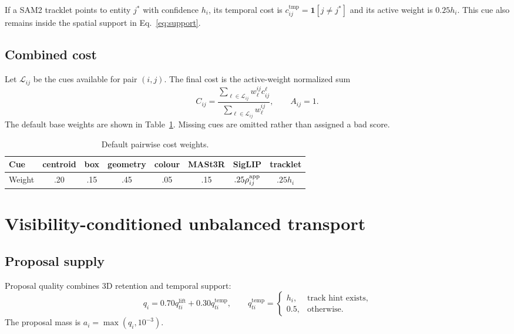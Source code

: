 \documentclass[11pt]{article}
\newcommand{\1}{\bm{1}}
\begin{document}
If a SAM2 tracklet points to entity $j^*$ with confidence $h_i$, its temporal
cost is $c^{\mathrm{tmp}}_{ij}=\1[j\neq j^*]$ and its active weight is
$0.25h_i$. This cue also remains inside the spatial support in
Eq.~\eqref{eq:support}.

\subsection{Combined cost}

Let $\mathcal{L}_{ij}$ be the cues available for pair $(i,j)$. The final cost is
the active-weight normalized sum
\begin{equation}
C_{ij}=\frac{\sum_{\ell\in\mathcal L_{ij}}w^{ij}_{\ell}c^{\ell}_{ij}}
{\sum_{\ell\in\mathcal L_{ij}}w^{ij}_{\ell}},
\qquad A_{ij}=1.
\label{eq:combined-cost}
\end{equation}
The default base weights are shown in Table~\ref{tab:cost-weights}. Missing cues
are omitted rather than assigned a bad score.

\begin{table}[h]
\centering
\caption{Default pairwise cost weights.}
\label{tab:cost-weights}
\begin{tabular}{lccccccc}
\toprule
Cue & centroid & box & geometry & colour & MASt3R & SigLIP & tracklet\\
\midrule
Weight & .20 & .15 & .45 & .05 & .15 & $.25\rho^{\rm app}_{ij}$ & $.25h_i$\\
\bottomrule
\end{tabular}
\end{table}

\section{Visibility-conditioned unbalanced transport}

\subsection{Proposal supply}

Proposal quality combines 3D retention and temporal support:
\begin{equation}
q_i=0.70q^{\mathrm{lift}}_{ti}+0.30q^{\mathrm{temp}}_{ti},
\qquad
q^{\mathrm{temp}}_{ti}=
\begin{cases}h_i,&\text{track hint exists},\\0.5,&\text{otherwise}.
\end{cases}
\end{equation}
The proposal mass is $a_i=\max(q_i,10^{-3})$.
\end{document}

